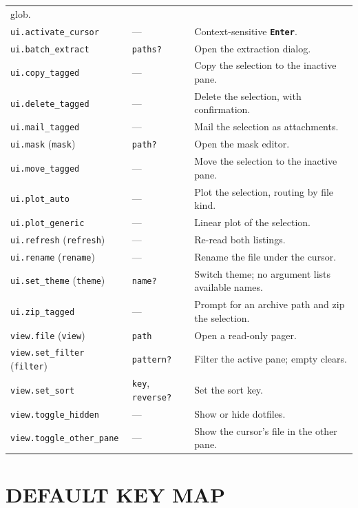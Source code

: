 \documentclass[tm]{ornltm}
\newcommand{\key}[1]{\textbf{\texttt{#1}}}
\begin{document}
\begin{small}
\begin{longtable}{p{} p{} p{}}
    glob. \\
  \texttt{ui.activate\_cursor} & --- & Context-sensitive \key{Enter}. \\
  \texttt{ui.batch\_extract} & \texttt{paths?} & Open the extraction dialog. \\
  \texttt{ui.copy\_tagged} & --- & Copy the selection to the inactive pane. \\
  \texttt{ui.delete\_tagged} & --- & Delete the selection, with
    confirmation. \\
  \texttt{ui.mail\_tagged} & --- & Mail the selection as attachments. \\
  \texttt{ui.mask} (\texttt{mask}) & \texttt{path?} & Open the mask editor. \\
  \texttt{ui.move\_tagged} & --- & Move the selection to the inactive pane. \\
  \texttt{ui.plot\_auto} & --- & Plot the selection, routing by file kind. \\
  \texttt{ui.plot\_generic} & --- & Linear plot of the selection. \\
  \texttt{ui.refresh} (\texttt{refresh}) & --- & Re-read both listings. \\
  \texttt{ui.rename} (\texttt{rename}) & --- & Rename the file under the
    cursor. \\
  \texttt{ui.set\_theme} (\texttt{theme}) & \texttt{name?} & Switch theme; no
    argument lists available names. \\
  \texttt{ui.zip\_tagged} & --- & Prompt for an archive path and zip the
    selection. \\
  \texttt{view.file} (\texttt{view}) & \texttt{path} & Open a read-only
    pager. \\
  \texttt{view.set\_filter} (\texttt{filter}) & \texttt{pattern?} & Filter the
    active pane; empty clears. \\
  \texttt{view.set\_sort} & \texttt{key}, \texttt{reverse?} & Set the sort
    key. \\
  \texttt{view.toggle\_hidden} & --- & Show or hide dotfiles. \\
  \texttt{view.toggle\_other\_pane} & --- & Show the cursor's file in the other
    pane. \\
\end{longtable}
\end{small}

\section{DEFAULT KEY MAP}
\label{sec:appkeys}
\end{document}
